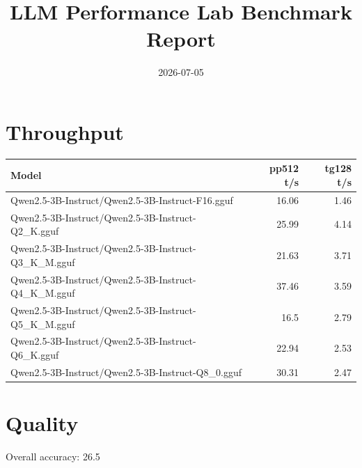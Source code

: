 \documentclass{article}
\begin{document}
\title{LLM Performance Lab Benchmark Report}
\date{2026-07-05}
\maketitle
\section{Throughput}
\begin{tabular}{lrr}
\toprule
Model & pp512 t/s & tg128 t/s \\
\midrule
Qwen2.5-3B-Instruct/Qwen2.5-3B-Instruct-F16.gguf & 16.06 & 1.46 \\
Qwen2.5-3B-Instruct/Qwen2.5-3B-Instruct-Q2\_K.gguf & 25.99 & 4.14 \\
Qwen2.5-3B-Instruct/Qwen2.5-3B-Instruct-Q3\_K\_M.gguf & 21.63 & 3.71 \\
Qwen2.5-3B-Instruct/Qwen2.5-3B-Instruct-Q4\_K\_M.gguf & 37.46 & 3.59 \\
Qwen2.5-3B-Instruct/Qwen2.5-3B-Instruct-Q5\_K\_M.gguf & 16.5 & 2.79 \\
Qwen2.5-3B-Instruct/Qwen2.5-3B-Instruct-Q6\_K.gguf & 22.94 & 2.53 \\
Qwen2.5-3B-Instruct/Qwen2.5-3B-Instruct-Q8\_0.gguf & 30.31 & 2.47 \\
\bottomrule
\end{tabular}
\section{Quality}
Overall accuracy: 26.5%
\end{document}
